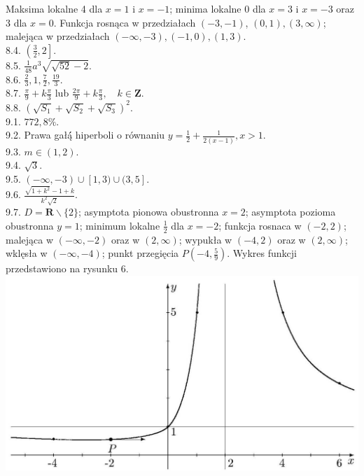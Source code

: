 \documentclass[10pt]{article}
\begin{document}
Maksima lokalne 4 dla $x=1$ i $x=-1$; minima lokalne 0 dla $x=3$ i $x=-3$ oraz 3 dla $x=0$. Funkcja rosnąca w przedziałach $(-3,-1)$, $(0,1),(3, \infty)$; malejąca w przedziałach $(-\infty,-3),(-1,0),(1,3)$.\\
8.4. $\left(\frac{3}{2}, 2\right]$.\\
8.5. $\frac{1}{48} a^{3} \sqrt{\sqrt{52}-2}$.\\
8.6. $\frac{2}{3}, 1, \frac{7}{2}, \frac{19}{3}$.\\
8.7. $\frac{\pi}{9}+k \frac{\pi}{3}$ lub $\frac{2 \pi}{9}+k \frac{\pi}{3}, \quad k \in \mathbf{Z}$.\\
8.8. $\left(\sqrt{S_{1}}+\sqrt{S_{2}}+\sqrt{S_{3}}\right)^{2}$.\\
9.1. $772,8 \%$.\\
9.2. Prawa gałą́́ hiperboli o równaniu $y=\frac{1}{2}+\frac{1}{2(x-1)}, x>1$.\\
9.3. $m \in(1,2)$.\\
9.4. $\sqrt{3}$.\\
9.5. $(-\infty,-3) \cup[1,3) \cup(3,5]$.\\
9.6. $\frac{\sqrt{1+k^{2}}-1+k}{k^{2} \sqrt{2}}$.\\
9.7. $D=\mathbf{R} \backslash\{2\}$; asymptota pionowa obustronna $x=2$; asymptota pozioma obustronna $y=1$; minimum lokalne $\frac{1}{2}$ dla $x=-2$; funkcja rosnaca w $(-2,2)$; malejąca w $(-\infty,-2)$ oraz w $(2, \infty)$; wypukła w $(-4,2)$ oraz w $(2, \infty)$; wklęsła w $(-\infty,-4)$; punkt przegięcia $P\left(-4, \frac{5}{9}\right)$. Wykres funkcji przedstawiono na rysunku 6.\\
\includegraphics[max width=\textwidth, center]{2024_11_16_fe5b564401bf7db98894g-059}
\end{document}
